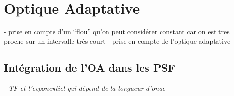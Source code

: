 \section{\centering Optique Adaptative}

- prise en compte d’un “flou” qu’on peut considérer constant car on est tres proche sur un intervalle très court
- prise en compte de l’optique adaptative

\subsection{Intégration de l’OA dans les PSF}

- \textsl{TF et l’exponentiel qui dépend de la longueur d’onde}